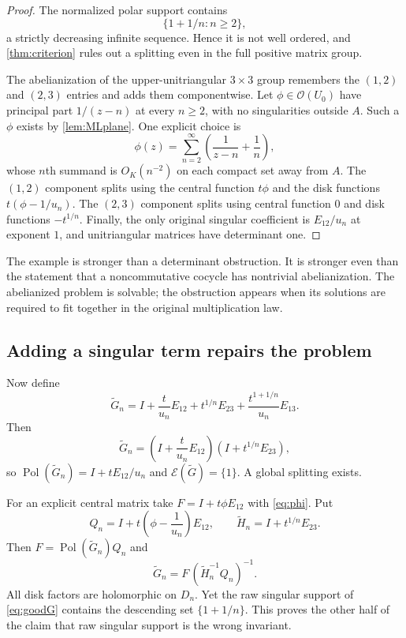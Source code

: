 \documentclass[11pt,letterpaper]{article}
\theoremstyle{definition}
\theoremstyle{remark}
\newcommand{\OO}{\mathcal O}
\newcommand{\Pol}{\operatorname{Pol}}
\newcommand{\EU}{\mathcal E}
\numberwithin{equation}{section}
\begin{document}
\begin{proof}
The normalized polar support contains
\[
 \{1+1/n:n\geq2\},
\]
a strictly decreasing infinite sequence. Hence it is not well ordered, and \cref{thm:criterion} rules out a splitting even in the full positive matrix group.

The abelianization of the upper-unitriangular $3\times3$ group remembers the $(1,2)$ and $(2,3)$ entries and adds them componentwise. Let $\phi\in\OO(U_0)$ have principal part $1/(z-n)$ at every $n\geq2$, with no singularities outside $A$. Such a $\phi$ exists by \cref{lem:MLplane}. One explicit choice is
\begin{equation}\label{eq:phi}
 \phi(z)=\sum_{n=2}^\infty\left(\frac1{z-n}+\frac1n\right),
\end{equation}
whose $n$th summand is $O_K(n^{-2})$ on each compact set away from $A$. The $(1,2)$ component splits using the central function $t\phi$ and the disk functions $t(\phi-1/u_n)$. The $(2,3)$ component splits using central function $0$ and disk functions $-t^{1/n}$. Finally, the only original singular coefficient is $E_{12}/u_n$ at exponent $1$, and unitriangular matrices have determinant one.
\end{proof}

The example is stronger than a determinant obstruction. It is stronger even than the statement that a noncommutative cocycle has nontrivial abelianization. The abelianized problem is solvable; the obstruction appears when its solutions are required to fit together in the original multiplication law.

\subsection{Adding a singular term repairs the problem}

Now define
\begin{equation}\label{eq:goodG}
 \widetilde G_n
 =I+\frac{t}{u_n}E_{12}+t^{1/n}E_{23}
      +\frac{t^{1+1/n}}{u_n}E_{13}.
\end{equation}
Then
\[
 \widetilde G_n
 =\left(I+\frac{t}{u_n}E_{12}\right)
  \left(I+t^{1/n}E_{23}\right),
\]
so $\Pol(\widetilde G_n)=I+tE_{12}/u_n$ and $\EU(\widetilde G)=\{1\}$. A global splitting exists.

For an explicit central matrix take $F=I+t\phi E_{12}$ with \eqref{eq:phi}. Put
\[
 Q_n=I+t\left(\phi-\frac1{u_n}\right)E_{12},
 \qquad \widetilde H_n=I+t^{1/n}E_{23}.
\]
Then $F=\Pol(\widetilde G_n)Q_n$ and
\[
 \widetilde G_n=F\,(\widetilde H_n^{-1}Q_n)^{-1}.
\]
All disk factors are holomorphic on $D_n$. Yet the raw singular support of \eqref{eq:goodG} contains the descending set $\{1+1/n\}$. This proves the other half of the claim that raw singular support is the wrong invariant.
\end{document}

